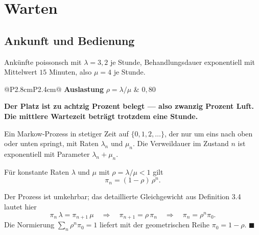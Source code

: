 \chapter{Warten}

\section{Ankunft und Bedienung}

\begin{merksatz}
Ankünfte poissonsch mit $\lambda = 3{,}2$ je Stunde, Behandlungsdauer exponentiell mit Mittelwert $15$ Minuten, also $\mu = 4$ je Stunde.

\begin{center}
{\small
\renewcommand{\arraystretch}{1.5}
\begin{tabular}{@{}P{2.8cm}P{2.4cm}@{}}
\toprule
\textbf{Auslastung} $\rho = \lambda/\mu$ & $0{,}80$\\
\bottomrule
\end{tabular}}
\end{center}

\begin{center}
\begin{minipage}{0.9\textwidth}
\textbf{Der Platz ist zu achtzig Prozent belegt --- also zwanzig Prozent Luft. Die mittlere Wartezeit beträgt trotzdem eine Stunde.}
\end{minipage}
\end{center}
\end{merksatz}

\begin{definition}
Ein Markow-Prozess in stetiger Zeit auf $\{0,1,2,\ldots\}$, der nur um eins nach oben oder unten springt, mit Raten $\lambda_n$ und $\mu_n$. Die Verweildauer im Zustand $n$ ist exponentiell mit Parameter $\lambda_n + \mu_n$.
\end{definition}

\begin{merksatz}
Für konstante Raten $\lambda$ und $\mu$ mit $\rho = \lambda/\mu < 1$ gilt
\[ \pi_n = (1-\rho)\,\rho^{n} . \]

Der Prozess ist umkehrbar; das detaillierte Gleichgewicht aus Definition 3.4 lautet hier
\[ \pi_n\,\lambda = \pi_{n+1}\,\mu \quad\Longrightarrow\quad \pi_{n+1} = \rho\,\pi_n \quad\Longrightarrow\quad \pi_n = \rho^{n}\pi_0 . \]
Die Normierung $\sum_n \rho^n \pi_0 = 1$ liefert mit der geometrischen Reihe $\pi_0 = 1-\rho$. $\blacksquare$

\begin{center}
\begin{minipage}{0.88\textwidth}
\end{minipage}
\end{center}
\end{merksatz}

